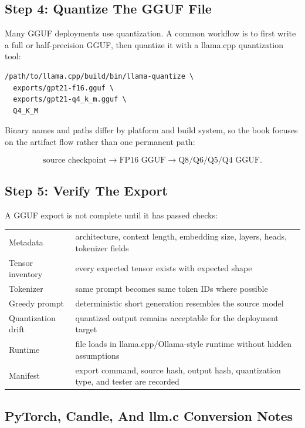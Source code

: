 \subsection{Step 4: Quantize The GGUF File}

Many GGUF deployments use quantization. A common workflow is to first write a full or
half-precision GGUF, then quantize it with a llama.cpp quantization tool:

\begin{lstlisting}
/path/to/llama.cpp/build/bin/llama-quantize \
  exports/gpt21-f16.gguf \
  exports/gpt21-q4_k_m.gguf \
  Q4_K_M
\end{lstlisting}

Binary names and paths differ by platform and build system, so the book focuses on the
artifact flow rather than one permanent path:

\[
\text{source checkpoint}
\rightarrow
\text{FP16 GGUF}
\rightarrow
\text{Q8/Q6/Q5/Q4 GGUF}.
\]

\subsection{Step 5: Verify The Export}

A GGUF export is not complete until it has passed checks:

\begin{longtable}{p{}p{}}
\toprule
\term{Check} & \term{What to verify} \\
\midrule
Metadata & architecture, context length, embedding size, layers, heads, tokenizer fields \\
Tensor inventory & every expected tensor exists with expected shape \\
Tokenizer & same prompt becomes same token IDs where possible \\
Greedy prompt & deterministic short generation resembles the source model \\
Quantization drift & quantized output remains acceptable for the deployment target \\
Runtime & file loads in llama.cpp/Ollama-style runtime without hidden assumptions \\
Manifest & export command, source hash, output hash, quantization type, and tester are recorded \\
\bottomrule
\end{longtable}

\subsection{PyTorch, Candle, And llm.c Conversion Notes}

